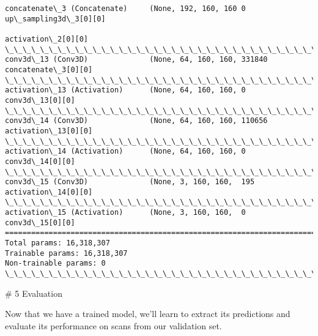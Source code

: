 \documentclass[11pt]{article}
\begin{document}
\begin{Verbatim}[commandchars=\\\{\}]
concatenate\_3 (Concatenate)     (None, 192, 160, 160 0           up\_sampling3d\_3[0][0]            
                                                                 activation\_2[0][0]               
\_\_\_\_\_\_\_\_\_\_\_\_\_\_\_\_\_\_\_\_\_\_\_\_\_\_\_\_\_\_\_\_\_\_\_\_\_\_\_\_\_\_\_\_\_\_\_\_\_\_\_\_\_\_\_\_\_\_\_\_\_\_\_\_\_\_\_\_\_\_\_\_\_\_\_\_\_\_\_\_\_\_\_\_\_\_\_\_\_\_\_\_\_\_\_\_\_\_
conv3d\_13 (Conv3D)              (None, 64, 160, 160, 331840      concatenate\_3[0][0]              
\_\_\_\_\_\_\_\_\_\_\_\_\_\_\_\_\_\_\_\_\_\_\_\_\_\_\_\_\_\_\_\_\_\_\_\_\_\_\_\_\_\_\_\_\_\_\_\_\_\_\_\_\_\_\_\_\_\_\_\_\_\_\_\_\_\_\_\_\_\_\_\_\_\_\_\_\_\_\_\_\_\_\_\_\_\_\_\_\_\_\_\_\_\_\_\_\_\_
activation\_13 (Activation)      (None, 64, 160, 160, 0           conv3d\_13[0][0]                  
\_\_\_\_\_\_\_\_\_\_\_\_\_\_\_\_\_\_\_\_\_\_\_\_\_\_\_\_\_\_\_\_\_\_\_\_\_\_\_\_\_\_\_\_\_\_\_\_\_\_\_\_\_\_\_\_\_\_\_\_\_\_\_\_\_\_\_\_\_\_\_\_\_\_\_\_\_\_\_\_\_\_\_\_\_\_\_\_\_\_\_\_\_\_\_\_\_\_
conv3d\_14 (Conv3D)              (None, 64, 160, 160, 110656      activation\_13[0][0]              
\_\_\_\_\_\_\_\_\_\_\_\_\_\_\_\_\_\_\_\_\_\_\_\_\_\_\_\_\_\_\_\_\_\_\_\_\_\_\_\_\_\_\_\_\_\_\_\_\_\_\_\_\_\_\_\_\_\_\_\_\_\_\_\_\_\_\_\_\_\_\_\_\_\_\_\_\_\_\_\_\_\_\_\_\_\_\_\_\_\_\_\_\_\_\_\_\_\_
activation\_14 (Activation)      (None, 64, 160, 160, 0           conv3d\_14[0][0]                  
\_\_\_\_\_\_\_\_\_\_\_\_\_\_\_\_\_\_\_\_\_\_\_\_\_\_\_\_\_\_\_\_\_\_\_\_\_\_\_\_\_\_\_\_\_\_\_\_\_\_\_\_\_\_\_\_\_\_\_\_\_\_\_\_\_\_\_\_\_\_\_\_\_\_\_\_\_\_\_\_\_\_\_\_\_\_\_\_\_\_\_\_\_\_\_\_\_\_
conv3d\_15 (Conv3D)              (None, 3, 160, 160,  195         activation\_14[0][0]              
\_\_\_\_\_\_\_\_\_\_\_\_\_\_\_\_\_\_\_\_\_\_\_\_\_\_\_\_\_\_\_\_\_\_\_\_\_\_\_\_\_\_\_\_\_\_\_\_\_\_\_\_\_\_\_\_\_\_\_\_\_\_\_\_\_\_\_\_\_\_\_\_\_\_\_\_\_\_\_\_\_\_\_\_\_\_\_\_\_\_\_\_\_\_\_\_\_\_
activation\_15 (Activation)      (None, 3, 160, 160,  0           conv3d\_15[0][0]                  
==================================================================================================
Total params: 16,318,307
Trainable params: 16,318,307
Non-trainable params: 0
\_\_\_\_\_\_\_\_\_\_\_\_\_\_\_\_\_\_\_\_\_\_\_\_\_\_\_\_\_\_\_\_\_\_\_\_\_\_\_\_\_\_\_\_\_\_\_\_\_\_\_\_\_\_\_\_\_\_\_\_\_\_\_\_\_\_\_\_\_\_\_\_\_\_\_\_\_\_\_\_\_\_\_\_\_\_\_\_\_\_\_\_\_\_\_\_\_\_

    \end{Verbatim}

     \# 5 Evaluation

Now that we have a trained model, we'll learn to extract its predictions
and evaluate its performance on scans from our validation set.
\end{document}
